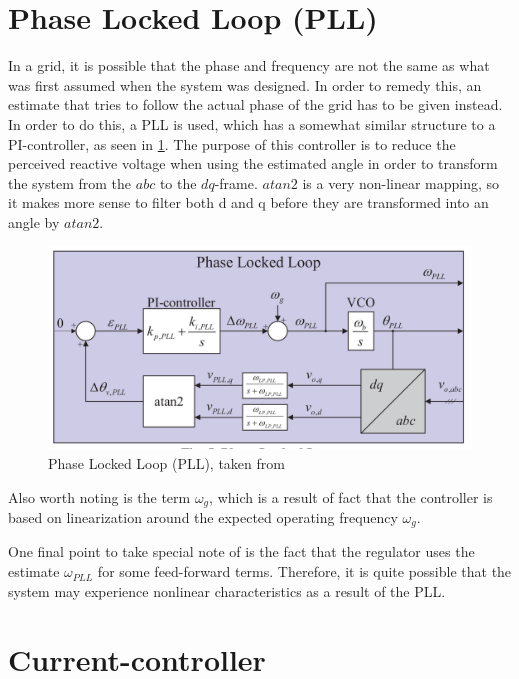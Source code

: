 \section{Phase Locked Loop (PLL)}
\label{sec:PLL}
In a grid, it is possible that the phase and frequency are not the same as what was first assumed when the system was designed. In order to remedy this, an estimate that tries to follow the actual phase of the grid has to be given instead. In order to do this, a PLL is used, which has a somewhat similar structure to a PI-controller, as seen in \cref{fig:PLL_fig}. The purpose of this controller is to reduce the perceived reactive voltage when using the estimated angle in order to transform the system from the $abc$ to the $dq$-frame. $atan2$ is a very non-linear mapping, so it makes more sense to filter both d and q before they are transformed into an angle by $atan2$. 

\begin{figure}
 \centering
 \includegraphics[width=\textwidth,height=\textheight,keepaspectratio]{Figures/PLL.png}
 \caption{Phase Locked Loop (\gls{PLL}), taken from \cite{Suul_paper_1,Suul_electro_presentation_1}}
 \label{fig:PLL_fig}
\end{figure}{}
 
Also worth noting is the term $\omega_g$, which is a result of fact that the controller is based on linearization around the expected operating frequency $\omega_g$. 

One final point to take special note of is the fact that the regulator uses the estimate $\omega_{PLL}$ for some feed-forward terms. Therefore, it is quite possible that the system may experience nonlinear characteristics as a result of the PLL. 

\section{Current-controller}

